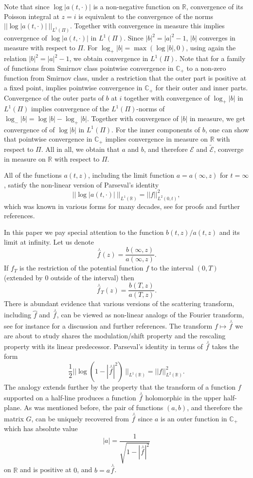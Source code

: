 \documentclass[11pt,twoside,reqno]{amsart}
\def\ti{\tilde}
\def \nlhat {\overset{\ \curlywedge}}
\def\R{{\mathbb R}}
\def\C{{\mathbb{C}}}
\def\EE{{\mathcal E}}
\theoremstyle{plain}
\numberwithin{equation}{section}
\begin{document}
Note that since $\log |a(t,\cdot)|$ is a non-negative function on $\R$, convergence of its
Poisson integral at $z=i$ is equivalent to the convergence of the norms $||\log |a(t,\cdot)|\ ||_{L^1(\Pi)}$.
Together with convergence in measure this implies convergence of $\log |a(t,\cdot)|$ in $L^1(\Pi)$.
Since $|b|^2=|a|^2-1$, $|b|$ converges in measure with respect to $\Pi$.
 For $\log_+ |b|=\max(\log |b|,0)$,
using again the relation $|b|^2=|a|^2-1$, we obtain convergence in $L^1(\Pi)$.
Note that for a family of functions from Smirnov class pointwise convergence in $\C_+$  to a non-zero function from Smirnov class, under a restriction
that the outer part is positive at a fixed point, implies pointwise
convergence in $\C_+$ for their outer and inner parts.
Convergence of the outer parts of $b$ at $i$ together with convergence of $\log_+ |b|$ in $L^1(\Pi)$
implies convergence of the $L^1(\Pi)$-norms of $\log_- |b|=\log |b|-\log_+ |b|$. Together with convergence of $|b|$ in measure, we get convergence of
 of $\log |b|$ in $L^1(\Pi)$. For the inner components of $b$,
one can show that pointwise convergence in $\C_+$ implies convergence in measure on $\R$ with respect to $\Pi$. All in all, we obtain that $a$ and  $b$, and therefore $\EE$ and $\ti \EE$,
converge in measure on $\R$ with respect to $\Pi$.


All of the functions $a(t,z)$, including the limit function $a=a(\infty, z)$ for $t=\infty$, satisfy the non-linear version of Parseval's identity
\begin{equation}||\log |a(t,\cdot)|\ ||_{L^1(\R)}=||f||_{L^2(0,t)}^2,\label{eqParseval}\end{equation}
which was known in various forms for many decades, see \cite{Den, MTT, TT} for proofs and further references.

In this paper we pay special attention to the function $b(t,z)/a(t,z)$ and its limit at infinity. Let us denote
$$\nlhat f(z)=\frac {b(\infty,z)}{a(\infty,z)}.$$
If $f_T$ is the restriction of the potential function $f$ to the interval $(0,T)$ (extended by $0$ outside of the interval) then
$$\nlhat f_T(z)=\frac {b(T,z)}{a(T,z)}.$$
There is abundant evidence  that various versions of the scattering transform, including
 $\overbrace{f}$ and $\nlhat f$, can be viewed as  non-linear analogs of the Fourier transform, see for instance
\cite{MTT, S, T, TT} for a discussion and further references. The transform $f\mapsto \nlhat f$ we are about to study
shares the modulation/shift property and the rescaling property with its linear predecessor. Parseval's identity in
terms of $\nlhat f$ takes the form
$$\frac 12||\log (1-|\nlhat f|^2)\ ||_{L^1(\R)}=||f||_{L^2(\R)}^2.$$
The analogy extends further by the property that the transform of a function $f$ supported on a half-line produces
a function $\nlhat f$ holomorphic in the upper half-plane. As was mentioned before, the pair of functions $(a,b)$,
and therefore the matrix $G$, can be uniquely recovered from $\nlhat f$ since $a$ is an outer function
in $\C_+$ which has absolute value $$|a|=\frac1{\sqrt{1-|\nlhat f|^2}}$$ on $\R$ and is positive at $0$, and $b=a\nlhat f$.
\end{document}
